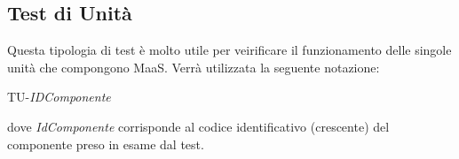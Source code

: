 \newpage
\subsection{Test di Unità}
Questa tipologia di test è molto utile per veirificare il funzionamento delle singole unità che compongono MaaS.
Verrà utilizzata la seguente notazione:
	\begin{center}
		TU-\textit{IDComponente}
	\end{center}
dove \textit{IdComponente} corrisponde al codice identificativo (crescente) del componente preso in esame dal test.




 

